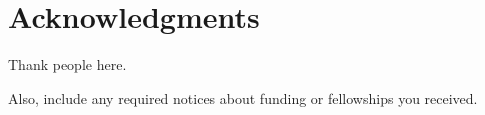 \chapter*{Acknowledgments}

Thank people here.

Also, include any required notices about funding or fellowships you received.